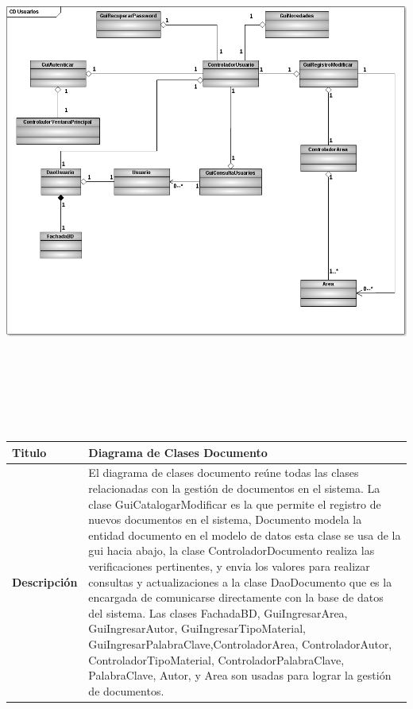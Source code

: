 	\begin{minipage}[c]{1\linewidth}
	\centering
	\includegraphics[width=20cm, height=17cm, angle=90]{diagramasClase/DiagramaClases1}
	\end{minipage}
			
		
	

				
	\begin{tabular}{|p{5cm}|p{11cm}|}\hline
	{\bf Titulo} & {Diagrama de Clases Documento}\\
	\hline
	{\bf Descripción} & {El diagrama de clases documento reúne todas las clases
	relacionadas con la gestión de documentos en el sistema.\newline
	La clase GuiCatalogarModificar es la que permite el registro de nuevos documentos
	en el sistema, Documento modela la entidad documento en el modelo de datos esta clase
	se usa de la gui hacia abajo, la clase ControladorDocumento realiza las verificaciones 
	pertinentes, y envia los valores para realizar consultas y actualizaciones a la clase 
	DaoDocumento que es la encargada de comunicarse directamente con la base de datos del
	sistema.\newline
	Las clases FachadaBD, GuiIngresarArea, GuiIngresarAutor, GuiIngresarTipoMaterial,
	GuiIngresarPalabraClave,ControladorArea, ControladorAutor, ControladorTipoMaterial,
	ControladorPalabraClave, PalabraClave, Autor, y Area son usadas para lograr la gestión de
	documentos.}\\
	\hline
	\end{tabular}\\[.5cm]
	
